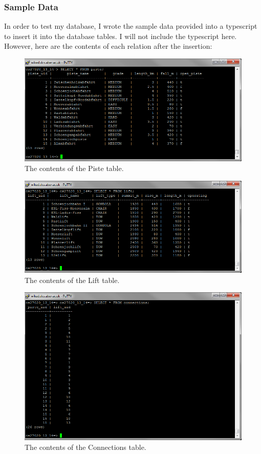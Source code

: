 \documentclass[11pt]{scrartcl} %
\begin{document}
\subsubsection{Sample Data}
In order to test my database, I wrote the sample data provided into a typescript to insert it into the database tables. I will not include the typescript here. However, here are the contents of each relation after the insertion:

\begin{figure}[H]
  \centering
    \includegraphics[width=1\textwidth]{IMG/content_piste.png}
 \caption{The contents of the Piste table.}
\end{figure}
\begin{figure}[H]
  \centering
    \includegraphics[width=1\textwidth]{IMG/content_lift.png}
 \caption{The contents of the Lift table.}
\end{figure}
\begin{figure}[H]
  \centering
    \includegraphics[width=1\textwidth]{IMG/content_connections.png}
 \caption{The contents of the Connections table.}
\end{figure}
\end{document}

